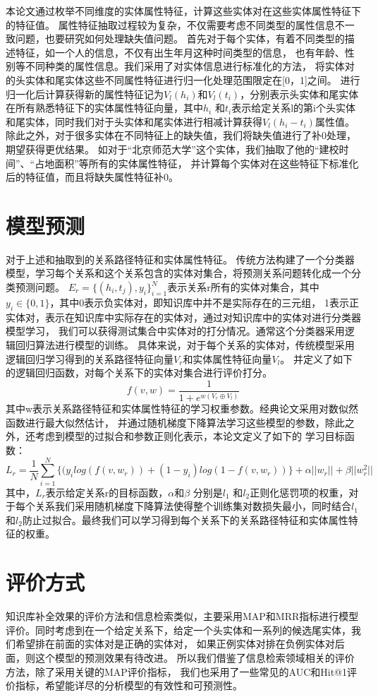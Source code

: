 本论文通过枚举不同维度的实体属性特征，计算这些实体对在这些实体属性特征下的特征值。
属性特征抽取过程较为复杂，不仅需要考虑不同类型的属性信息不一致问题，也要研究如何处理缺失值问题。
首先对于每个实体，有着不同类型的描述特征，如一个人的信息，不仅有出生年月这种时间类型的信息，
也有年龄、性别等不同种类的属性信息。我们采用了对实体信息进行标准化的方法，
将实体对的头实体和尾实体这些不同属性特征进行归一化处理范围限定在[0，1]之间。
进行归一化后计算获得新的属性特征记为$V_l(h_i)$和$V_l (t_i)$，分别表示头实体和尾实体在所有熟悉特征下的实体属性特征向量，其中$h_i$ 和$t_i$表示给定关系l的第i个头实体和尾实体，同时我们对于头实体和尾实体进行相减计算获得$V_l(h_i-t_i )$属性值。除此之外，对于很多实体在不同特征上的缺失值，我们将缺失值进行了补0处理，期望获得更优结果。
如对于“北京师范大学”这个实体，我们抽取了他的“建校时间”、“占地面积”等所有的实体属性特征，
并计算每个实体对在这些特征下标准化后的特征值，而且将缺失属性特征补0。

\section{模型预测}
对于上述\label{sec:literal}和\label{sec:relational}抽取到的关系路径特征和实体属性特征。
传统方法构建了一个分类器模型，学习每个关系和这个关系包含的实体对集合，将预测关系问题转化成一个分类预测问题。
$E_r=\{(h_i,t_j),y_i\}^N_{i=1} $表示关系r所有的实体对集合，其中$y_i\in \{0,1\}$，其中0表示负实体对，即知识库中并不是实际存在的三元组，
1表示正实体对，表示在知识库中实际存在的实体对，通过对知识库中的实体对进行分类器模型学习，
我们可以获得测试集合中实体对的打分情况。通常这个分类器采用逻辑回归算法进行模型的训练。
具体来说，对于每个关系的实体对，传统模型采用逻辑回归学习得到的关系路径特征向量$V_r$和实体属性特征向量$V_l$。
并定义了如下的逻辑回归函数，对每个关系下的实体对集合进行评价打分。
$$f(v,w)=\frac{1}{1+e^{w(V_r \oplus  V_l)}}$$
其中w表示关系路径特征和实体属性特征的学习权重参数。经典论文采用对数似然函数进行最大似然估计，
并通过随机梯度下降算法学习这些模型的参数，除此之外，还考虑到模型的过拟合和参数正则化表示，本论文定义了如下的
学习目标函数：
$$L_r=\frac{1}{N}\sum_{i=1}^N\{(y_ilog(f(v,w_r)) + (1-y_i)log(1-f(v,w_r))\}+\alpha ||w_r||+\beta||w_r^2||$$
其中，$L_r$表示给定关系r的目标函数，$\alpha$和$\beta$ 分别是$l_1$ 和$l_2$正则化惩罚项的权重，对于每个关系我们采用随机梯度下降算法使得整个训练集对数损失最小，同时结合$l_1$ 和$l_2$防止过拟合。最终我们可以学习得到每个关系下的关系路径特征和实体属性特征的权重。


\section{评价方式}
\label{sec:metrics}
知识库补全效果的评价方法和信息检索类似，主要采用MAP和MRR\cite{Gardner2014}指标进行模型评价。同时考虑到在一个给定关系下，给定一个头实体和一系列的候选尾实体，我们希望排在前面的实体对是正确的实体对，
如果正例实体对排在负例实体对后面，则这个模型的预测效果有待改进。
所以我们借鉴了信息检索领域相关的评价方法，除了采用关键的MAP评价指标，
我们也采用了一些常见的AUC和Hit@1评价指标，希望能详尽的分析模型的有效性和可预测性。

